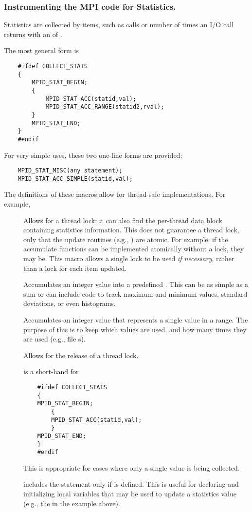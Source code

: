 \documentclass{article}
\begin{document}
\subsubsection{Instrumenting the MPI code for Statistics.}
Statistics are collected by items, such as  calls or
number of times an I/O call returns with an  of
.  

The most general form is
\begin{verbatim}
    #ifdef COLLECT_STATS
    {
        MPID_STAT_BEGIN;
        {
            MPID_STAT_ACC(statid,val);
            MPID_STAT_ACC_RANGE(statid2,rval);
        }
        MPID_STAT_END;
    }
    #endif
\end{verbatim}

For very simple uses, these two one-line forms are provided:
\begin{verbatim}
    MPID_STAT_MISC(any statement);
    MPID_STAT_ACC_SIMPLE(statid,val);
\end{verbatim}

The definitions of these macros allow for thread-safe
implementations.  For example,
\begin{description}
\item[]Allows for a thread lock; it can also find the 
per-thread data block containing statistics information.  This does
not guarantee a thread lock, only that the update routines (e.g.,
) are atomic.  For example, if the accumulate
functions can be implemented atomically without a lock, they may be.
This macro allows a single lock to be used \emph{if necessary}, rather
than a lock for each item updated.

\item[]Accumulates an integer value into a predefined
.  This can be as simple as a sum or can include code to
track maximum and minimum values, standard deviations, or even
histograms. 

\item[]Accumulates an integer value that
represents a single value in a range.  The purpose of this is to keep
which values are used, and how many times they are used (e.g.,
file s).

\item[]Allows for the release of a thread lock.

\item[]is a short-hand for 
\begin{verbatim}
    #ifdef COLLECT_STATS
    {
    MPID_STAT_BEGIN;
        {
        MPID_STAT_ACC(statid,val);
        }
    MPID_STAT_END;
    }
    #endif
\end{verbatim}
This is appropriate for cases where only a single value is being
collected.

\item[]includes the statement only if
 is defined.  This is useful for declaring and
initializing local variables that may be used to update a statistics
value (e.g., the  in the example above).
\end{description}
\end{document}
